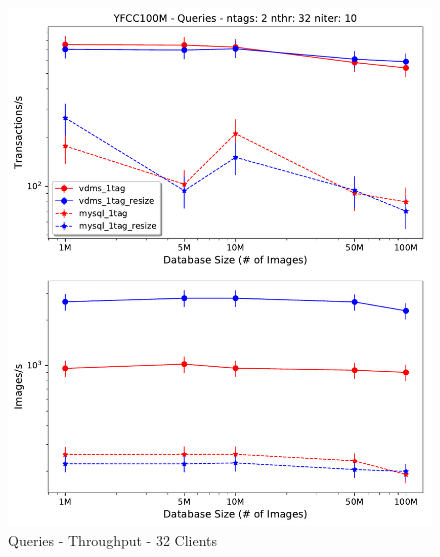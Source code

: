 \begin{figure}[t!]
\centering
\includegraphics[width=\columnwidth]{figures/queries_throughput_32}
\caption{Queries - Throughput - 32 Clients}
\label{fig:q_throughput_32}
\end{figure}

